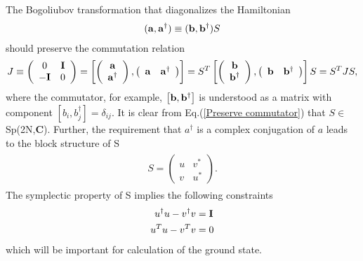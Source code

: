 The Bogoliubov transformation that diagonalizes the Hamiltonian
\begin{eqnarray}\begin{aligned}
\label{Def. of a}
({\bf a} , {\bf a}^\dagger)\equiv({\bf b} , {\bf b}^\dagger)S
\end{aligned}\end{eqnarray}
should preserve the commutation relation
\begin{eqnarray}\begin{aligned}
\label{Preserve commutator}
J\equiv\left(\begin{array}{ccc}
0 & {\bf I}\\
-{\bf I} & 0
\end{array}\right)
=\left[
\left(\begin{array}{ccc}
{\bf a} \\
{\bf a}^\dagger
\end{array}\right),
\left(\begin{array}{ccc}
{\bf a} & {\bf a}^\dagger
\end{array}\right)\right]
=S^T\left[
\left(\begin{array}{ccc}
{\bf b} \\
{\bf b}^\dagger
\end{array}\right),
\left(\begin{array}{ccc}
{\bf b} & {\bf b}^\dagger
\end{array}\right)\right]S
=S^T JS,
\end{aligned}\end{eqnarray}
where the commutator, for example, $\left[{\bf b},{\bf b}^\dagger\right]$ is understood as a matrix with component $\left[b_i,b_j^\dagger\right]=\delta_{ij}$. It is clear from Eq.(\ref{Preserve commutator}) that $S\in$Sp(2N,{\bf C})\cite{fulton_representation_2004}. Further, the requirement that $a^\dagger$ is a complex conjugation of $a$ leads to the block structure of S
\begin{eqnarray}\begin{aligned}
\label{Block of S}
S=\left(\begin{array}{ccc}
u & v^*\\
v & u^*
\end{array}\right).
\end{aligned}\end{eqnarray}
The symplectic property of S implies the following constraints 
\begin{eqnarray}
u^\dagger u-v^\dagger v&={\bf I}\label{Constraint 1}\\
u^T u-v^T v&=0\label{Constraint 2}
\end{eqnarray}
which will be important for calculation of the ground state. 

